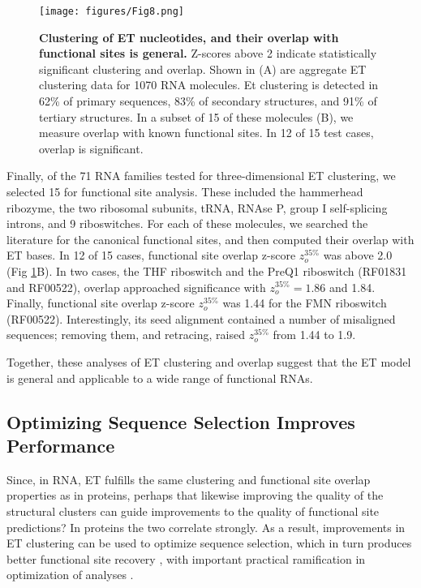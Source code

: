 \documentclass[12pt,a4paper]{report}
\begin{document}
\begin{figure}
\begin{minipage}[c][\textheight]{\textwidth}
\centering
\vspace{-3in}
  \texttt{[image: figures/Fig8.png]}
  \caption[Clustering of ET nucleotides, and their overlap with functional sites is general in RNA families.]{\textbf{Clustering of ET nucleotides, and their overlap with functional sites is general.} Z-scores above 2 indicate statistically significant clustering and overlap. Shown in (A) are aggregate ET clustering data for 1070 RNA molecules. Et clustering is detected in 62\% of primary sequences, 83\% of secondary structures, and 91\% of tertiary structures. In a subset of 15 of these molecules (B), we measure overlap with known functional sites. In 12 of 15 test cases, overlap is significant.}
  \label{fig:general_historgram}
  \end{minipage}
\end{figure}

Finally, of the 71 RNA families tested for three-dimensional ET clustering, we selected 15 for functional site analysis. These included the hammerhead ribozyme, the two ribosomal subunits, tRNA, RNAse P, group I self-splicing introns, and 9 riboswitches. For each of these molecules, we searched the literature for the canonical functional sites, and then computed their overlap with ET bases. In 12 of 15 cases, functional site overlap z-score $z_{o}^{35\%}$ was above 2.0 (Fig \ref{fig:general_historgram}B). In two cases, the THF riboswitch and the PreQ1 riboswitch (RF01831 and RF00522), overlap approached significance with $z_{o}^{35\%}=1.86$ and 1.84. Finally, functional site overlap z-score $z_{o}^{35\%}$ was 1.44 for the FMN riboswitch (RF00522). Interestingly, its seed alignment contained a number of misaligned sequences; removing them, and retracing, raised $z_{o}^{35\%}$ from 1.44 to 1.9.

Together, these analyses of ET clustering and overlap suggest that the ET model is general and applicable to a wide range of functional RNAs.

\subsection{Optimizing Sequence Selection Improves Performance}
Since, in RNA, ET fulfills the same clustering and functional site overlap properties as in proteins, perhaps that likewise improving the quality of the structural clusters can guide improvements to the quality of functional site predictions? In proteins the two correlate strongly. As a result, improvements in ET clustering can be used to optimize sequence selection, which in turn produces better functional site recovery \cite{Mihalek2006-1}, with important practical ramification in optimization of analyses \cite{Mihalek2006-2}. 
\end{document}
